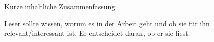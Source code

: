 
Kurze inhaltliche Zusammenfassung

Leser sollte wissen, worum es in der Arbeit geht und ob sie für ihn relevant/interessant ist. Er entscheidet daran, ob er sie liest.


